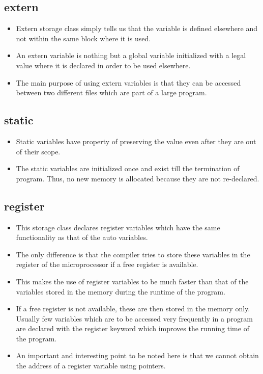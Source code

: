 \documentclass[11pt]{article}
\begin{document}
\subsection{extern}
\label{sec:org3368039}
\begin{itemize}
\item Extern storage class simply tells us that the variable is defined
elsewhere and not within the same block where it is used.
\item An extern variable is nothing but a global variable initialized with
a legal value where it is declared in order to be used elsewhere.
\item The main purpose of using extern variables is that they can be
accessed between two different files which are part of a large program.
\end{itemize}
\subsection{static}
\label{sec:org75d7905}
\begin{itemize}
\item Static variables have property of preserving the value even after
they are out of their scope.
\item The static variables are initialized once and exist till the
termination of program. Thus, no new memory is allocated because
they are not re-declared.
\end{itemize}
\subsection{register}
\label{sec:org72c49c2}
\begin{itemize}
\item This storage class declares register variables which have the same
functionality as that of the auto variables.
\item The only difference is that the  compiler tries to store these
variables in the register of the microprocessor if a free register
is available.
\item This makes the use of register variables to be much faster than that
of the variables stored in the memory during the runtime of the
program.
\item If a free register is not available, these are then stored in the
memory only. Usually few variables which are to be accessed very
frequently in a program are declared with the register keyword which
improves the running time of the program.
\item An important and interesting point to be noted here is that we
cannot obtain the address of a register variable using pointers.
\end{itemize}
\end{document}
